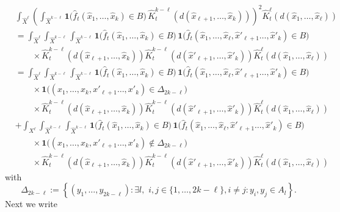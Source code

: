 \documentclass{article}
\theoremstyle{definition}
\numberwithin{equation}{section}
\theoremstyle{remark}
\begin{document}
\begin{align*}
   & \int_{\hat{X}^\ell}  \left( 
\int_{\hat{X}^{k - \ell}} 
\mathbf{1}\big( \hat{f}_t ( \hat{x}_1, \ldots, \hat{x}_k ) \in B \big) \, 
\hat{K}_t^{k - \ell}(d(\hat{x}_{\ell+1}, \ldots, \hat{x}_k)) 
\right)^2  \hat{K}_t^\ell(d(\hat{x}_1, \ldots, \hat{x}_\ell)) \\
& = \int_{\hat{X}^\ell}  
\int_{\hat{X}^{k - \ell}}\int_{\hat{X}^{k - \ell}} 
\mathbf{1}\big( \hat{f}_t ( \hat{x}_1, \ldots, \hat{x}_k ) \in B \big) \,  \mathbf{1}\big( \hat{f}_t ( \hat{x}_1, \ldots, \hat{x}_\ell, \hat{x}'_{\ell+1} \ldots, \hat{x}'_{k} ) \in B \big) \\
& \qquad \times \hat{K}_t^{k - \ell}(d(\hat{x}_{\ell+1}, \ldots, \hat{x}_k)) \hat{K}_t^{k - \ell}(d(\hat{x}'_{\ell+1}, \ldots, \hat{x}'_k))\hat{K}_t^\ell(d(\hat{x}_1, \ldots, \hat{x}_\ell))\\
& = \int_{\hat{X}^\ell}  
\int_{\hat{X}^{k - \ell}}\int_{\hat{X}^{k - \ell}} 
\mathbf{1}\big( \hat{f}_t ( \hat{x}_1, \ldots, \hat{x}_k ) \in B \big) \,  \mathbf{1}\big( \hat{f}_t ( \hat{x}_1, \ldots, \hat{x}_\ell, \hat{x}'_{\ell+1} \ldots, \hat{x}'_{k} ) \in B \big) \\
& \qquad \times  \mathbf{1}\big(  ( {x}_1, \ldots, {x}_k, {x}'_{\ell+1} \ldots, {x}'_{k} ) \in \Delta_{2k-\ell} \big) \\
& \qquad \times \hat{K}_t^{k - \ell}(d(\hat{x}_{\ell+1}, \ldots, \hat{x}_k)) \hat{K}_t^{k - \ell}(d(\hat{x}'_{\ell+1}, \ldots, \hat{x}'_k))\hat{K}_t^\ell(d(\hat{x}_1, \ldots, \hat{x}_\ell)) \\
 & + \int_{X^\ell}  
\int_{\hat{X}^{k - \ell}}\int_{\hat{X}^{k - \ell}} 
\mathbf{1}\big( \hat{f}_t ( \hat{x}_1, \ldots, \hat{x}_k ) \in B \big) \,  \mathbf{1}\big( \hat{f} _t( \hat{x}_1, \ldots, \hat{x}_\ell, \hat{x}'_{\ell+1} \ldots, \hat{x}'_{k} ) \in B \big) \\
& \qquad \times  \mathbf{1}\big(  ( {x}_1, \ldots, {x}_k, {x}'_{\ell+1} \ldots, {x}'_{k} ) \notin \Delta_{2k-\ell} \big) \\
& \qquad \times \hat{K}_t^{k - \ell}(d(\hat{x}_{\ell+1}, \ldots, \hat{x}_k)) \hat{K}_t^{k - \ell}(d(\hat{x}'_{\ell+1}, \ldots, \hat{x}'_k))\hat{K}_t^\ell(d(\hat{x}_1, \ldots, \hat{x}_\ell))
\end{align*}
with 
$$\Delta_{2k-\ell} := \left\{ (y_1, \ldots, y_{2k-\ell}) : \exists l, \,\, i,j \in \{1, \ldots, 2k-\ell \}, i \neq j : y_i,y_j \in A_l \right\} .$$
Next we write
\end{document}
